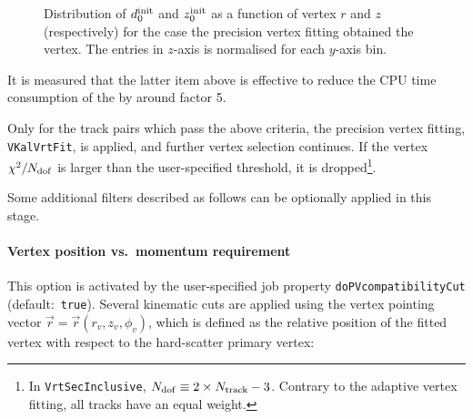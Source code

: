 \documentclass[NOTE, atlasdraft=true, texlive=2018, UKenglish]{\ATLASLATEXPATH atlasdoc}
\begin{document}
\begin{figure}[t]
\begin{center}
\caption{Distribution of  $d_{0}^{\rm init}$ and  $z_{0}^{\rm init}$ as a function of vertex $r$ and $z$ (respectively) for the case the precision vertex fitting obtained the vertex. The entries in $z$-axis is normalised for each $y$-axis bin.}
\label{fig:initVertexDisp}
\end{center}
\end{figure}

It is measured that the latter item above is effective to reduce the CPU time consumption of the by around factor 5.

Only for the track pairs which pass the above criteria, the precision vertex fitting, {\tt VKalVrtFit}, is applied, and further vertex selection continues. If the vertex $\chi^{2}/N_{\rm dof}$ is larger than the user-specified threshold, it is dropped\footnote{In {\tt VrtSecInclusive}, $N_{\rm dof} \equiv 2\times N_{\rm track} - 3$. Contrary to the adaptive vertex fitting, all tracks have an equal weight.}.

\pagebreak
Some additional filters described as follows can be optionally applied in this stage.
\paragraph{Vertex position vs.~momentum requirement}
This option is activated by the user-specified job property {\tt doPVcompatibilityCut} (default:~{\tt true}). Several kinematic cuts are applied using the vertex pointing vector $\vec{r} = \vec{r}(r_{v}, z_{v},\phi_{v})$, which is defined as the relative position of the fitted vertex with respect to the hard-scatter primary vertex:
\end{document}
